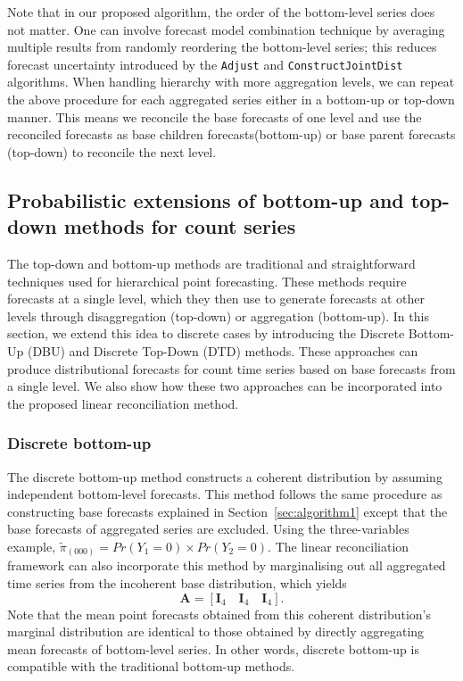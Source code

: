 \documentclass[a4paper,review,12pt,authoryear]{elsarticle}
\let\code=\texttt
\begin{document}
  Note that in our proposed algorithm, the order of the bottom-level series does not matter.
  One can involve forecast model combination technique by averaging multiple results from randomly reordering the bottom-level series; this reduces forecast uncertainty introduced by the \code{Adjust} and \code{ConstructJointDist} algorithms.
  When handling hierarchy with more aggregation levels, we can repeat the above procedure for each aggregated series either in a bottom-up or top-down manner. This means we reconcile the base forecasts of one level and use the reconciled forecasts as base children forecasts(bottom-up) or base parent forecasts (top-down) to reconcile the next level.

  

    \subsection{Probabilistic extensions of bottom-up and top-down methods for count series}

    The top-down and bottom-up methods are traditional and straightforward techniques used for hierarchical point forecasting. 
    These methods require forecasts at a single level, which they then use to generate forecasts at other levels through disaggregation (top-down) or aggregation (bottom-up).
    In this section, we extend this idea to discrete cases by introducing the Discrete Bottom-Up (DBU) and Discrete Top-Down (DTD) methods. These approaches can produce distributional forecasts for count time series based on base forecasts from a single level.
    We also show how these two approaches can be incorporated into the proposed linear reconciliation method.

    \subsubsection*{\textbf{Discrete bottom-up}}
    \label{sec:bottomup}

    The discrete bottom-up method constructs a coherent distribution by assuming independent bottom-level forecasts.
    This method follows the same procedure as constructing base forecasts explained in Section~\ref{sec:algorithm1} except that the base forecasts of aggregated series are excluded.
    Using the three-variables example, $\tilde{\pi}_{(000)} = Pr(Y_1=0)\times Pr(Y_2=0)$. 
    The linear reconciliation framework can also incorporate this method by marginalising out all aggregated time series from the incoherent base distribution, which yields \[
    \mathbf{A} = [\mathbf{I}_4\quad \mathbf{I}_4 \quad \mathbf{I}_4 ].
    \]
    Note that the mean point forecasts obtained from this coherent distribution's marginal distribution are identical to those obtained by directly aggregating mean forecasts of bottom-level series.
    In other words, discrete bottom-up is compatible with the traditional bottom-up methods.
\end{document}
